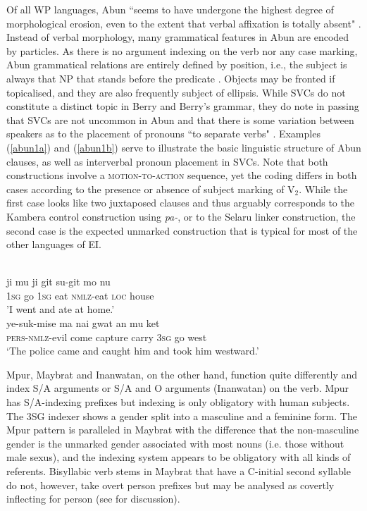 Of all WP languages, Abun ``seems to have undergone the highest degree of morphological erosion, even to the extent that verbal affixation is totally absent" \citep[205]{reesink2005west}. Instead of verbal morphology, many grammatical features in Abun are encoded by particles. As there is no argument indexing on the verb nor any case marking, Abun grammatical relations are entirely defined by position, i.e., the subject is always that NP that stands before the predicate \citep[51]{berry1999}. Objects may be fronted if topicalised, and they are also frequently subject of ellipsis. While SVCs do not constitute a distinct topic in Berry and Berry's grammar, they do note in passing that SVCs are not uncommon in Abun and that there is some variation between speakers as to the placement of pronouns ``to separate verbs" \citep[51]{berry1999}. Examples (\ref{abun1a}) and (\ref{abun1b}) serve to illustrate the basic linguistic structure of Abun clauses, as well as interverbal pronoun placement in SVCs. Note that both constructions involve a \textsc{motion-to-action} sequence, yet the coding differs in both cases according to the presence or absence of subject marking of V$_2$. While the first case looks like two juxtaposed clauses and thus arguably corresponds to the Kambera control construction using \textit{pa-}, or to the Selaru linker construction, the second case is the expected unmarked construction that is typical for most of the other languages of EI.

\ea
{}\\
\ea \label{abun1a}
\gll ji mu ji git su-git mo nu \\
\textsc{1}\textsc{sg} go \textsc{1}\textsc{sg} eat \textsc{nmlz}-eat \textsc{loc} house \\
\glft 'I went and ate at home.' \\
\ex \label{abun1b}
\gll ye-suk-mise ma nai gwat an mu ket \\ 
\textsc{pers}-\textsc{nmlz}-evil come capture carry \textsc{3}\textsc{sg} go west \\
\glft `The police came and caught him and took him westward.'
\z
\z

Mpur, Maybrat and Inanwatan, on the other hand, function quite differently and index S/A arguments or S/A and O arguments (Inanwatan) on the verb. Mpur has S/A-indexing prefixes but indexing is only obligatory with human subjects. The 3SG indexer shows a gender split into a masculine and a feminine form. The Mpur pattern is paralleled in Maybrat with the difference that the non-masculine gender is the unmarked gender associated with most nouns (i.e. those without male sexus), and the indexing system appears to be obligatory with all kinds of referents. Bisyllabic verb stems in Maybrat that have a C-initial second syllable do not, however, take overt person prefixes but may be analysed as covertly inflecting for person (see \citealt[52f.]{dol2007grammar} for discussion).


